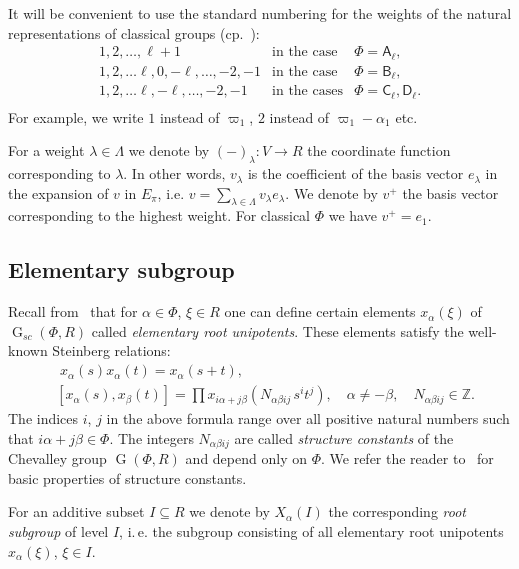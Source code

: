 \documentclass[12pt]{amsart}
\theoremstyle{plain} \declaretheorem[name=Theorem, Refname={Theorem,Theorems}]{thm} \Crefname{thm}{Theorem}{Theorems}
\numberwithin{equation}{section}
\theoremstyle{definition} \newtheorem{dfn}[lemma]{Definition} \Crefname{dfn}{Definition}{Definitions}
\theoremstyle{remark} \newtheorem{rem}[lemma]{Remark} \Crefname{rem}{Remark}{Remarks}
\DeclareMathOperator{\G}{G}
\newcommand{\rA}{\mathsf{A}}
\newcommand{\rB}{\mathsf{B}}
\newcommand{\rC}{\mathsf{C}}
\newcommand{\rD}{\mathsf{D}}
\begin{document}
It will be convenient to use the standard numbering for the weights of the natural representations of classical groups (cp.~\cite[§1B]{St78}):
\[\begin{array}{cll}
  1,2,\ldots, \ell+1 & \text{in the case} & \Phi =\rA_\ell, \\
  1,2,\ldots \ell, 0, -\ell,\ldots, -2, -1 & \text{in the case} & \Phi =\rB_\ell, \\
  1,2,\ldots \ell, -\ell,\ldots, -2, -1 & \text{in the cases}   & \Phi =\rC_\ell, \rD_\ell. \\
\end{array}\]
For example, we write $1$ instead of $\varpi_1$, $2$ instead of $\varpi_1-\alpha_1$ etc.

For a weight $\lambda\in \Lambda$ we denote by $(-)_\lambda\colon V\to R$ the coordinate function corresponding to $\lambda$.
In other words,  $v_\lambda$ is the coefficient of the basis vector $e_\lambda$ in the expansion of $v$ in $E_\pi$, i.e. $v=\sum_{\lambda\in \Lambda} v_\lambda e_\lambda$.
We denote by $v^+$ the basis vector corresponding to the highest weight.
For classical $\Phi$ we have $v^+=e_1$.

\subsection{Elementary subgroup}\label{sec:elementary}
Recall from~\cite{St78, VP} that for $\alpha\in \Phi$, $\xi\in R$ one can define certain elements $x_{\alpha}(\xi)$ of $\G_{sc}(\Phi, R)$ called {\it elementary root unipotents}.
These elements satisfy the well-known Steinberg relations:
\begin{align}
& \phantom{[}
x_\alpha(s) x_\alpha(t) = x_\alpha(s+t), \label{rel:add}\\
& [x_\alpha(s),  x_\beta(t)] = \prod x_{i\alpha + j\beta}\left(N_{\alpha\beta ij}\, s^i t^j\right),\quad \alpha\neq-\beta, \quad N_{\alpha\beta ij}\in\mathbb{Z}. \label{rel:CCF}
\end{align} 
The indices $i$, $j$ in the above formula range over all positive natural numbers such that $i\alpha + j\beta\in\Phi$.
The integers $N_{\alpha\beta ij}$ are called {\it structure constants} of the Chevalley group $\G(\Phi,R)$ and depend only on $\Phi$.
We refer the reader to~\cite[\S14]{VP} for basic properties of structure constants.

For an additive subset $I\subseteq R$ we denote by $X_\alpha(I)$ the corresponding \emph{root subgroup} of level $I$, i.\,e. the subgroup consisting of all elementary root unipotents $x_\alpha(\xi)$, $\xi\in I$.
\end{document}
